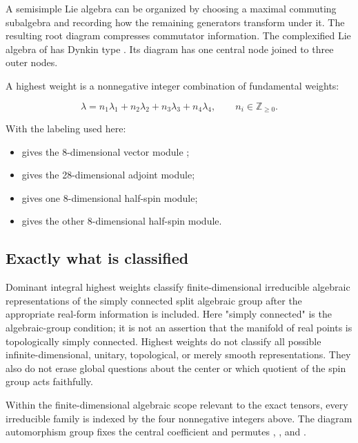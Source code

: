 \documentclass[11pt]{article}
\begin{document}
A semisimple Lie algebra can be organized by choosing a maximal commuting subalgebra and recording how the remaining generators transform under it. The resulting root diagram compresses commutator information. The complexified Lie algebra of \texttt{} has Dynkin type \texttt{}. Its diagram has one central node joined to three outer nodes.

A highest weight is a nonnegative integer combination of fundamental weights:

\[
\lambda=n_1\lambda_1+n_2\lambda_2+n_3\lambda_3+n_4\lambda_4,
\qquad n_i\in\mathbb Z_{\ge0}.
\]

With the labeling used here:

\begin{itemize}
\item \texttt{} gives the 8-dimensional vector module \texttt{};
\item \texttt{} gives the 28-dimensional adjoint module;
\item \texttt{} gives one 8-dimensional half-spin module;
\item \texttt{} gives the other 8-dimensional half-spin module.
\end{itemize}

\subsection{Exactly what is classified}

Dominant integral highest weights classify finite-dimensional irreducible algebraic representations of the simply connected split algebraic group after the appropriate real-form information is included. Here "simply connected" is the algebraic-group condition; it is not an assertion that the manifold of real points is topologically simply connected. Highest weights do not classify all possible infinite-dimensional, unitary, topological, or merely smooth representations. They also do not erase global questions about the center or which quotient of the spin group acts faithfully.

Within the finite-dimensional algebraic scope relevant to the exact tensors, every irreducible family is indexed by the four nonnegative integers above. The diagram automorphism group fixes the central coefficient \texttt{} and permutes \texttt{}, \texttt{}, and \texttt{}.
\end{document}
